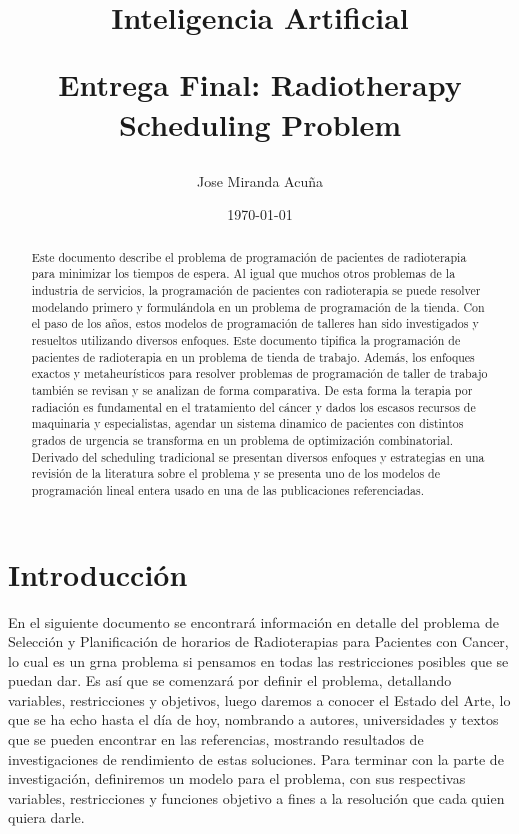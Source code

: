 \documentclass[letter, 10pt]{article}
\begin{document}
\title{Inteligencia Artificial \\ \begin{Large}Entrega Final: Radiotherapy Scheduling Problem\end{Large}}
\author{Jose Miranda Acuña}
\date{\today}
\maketitle





\begin{abstract}

Este documento describe el problema de programación de pacientes de radioterapia para minimizar los tiempos de espera. Al igual que muchos otros problemas de la industria de servicios, la programación de pacientes con radioterapia se puede resolver modelando primero y formulándola en un problema de programación de la tienda. Con el paso de los años, estos modelos de programación de talleres han sido investigados y resueltos utilizando diversos enfoques. Este documento tipifica la programación de pacientes de radioterapia en un problema de tienda de trabajo. Además, los enfoques exactos y metaheurísticos para resolver problemas de programación de taller de trabajo también se revisan y se analizan de forma comparativa. De esta forma la terapia por radiación es fundamental en el tratamiento del cáncer y dados los escasos recursos de maquinaria y especialistas, agendar un sistema dinamico de pacientes con distintos grados de urgencia se transforma en un problema de optimización combinatorial. Derivado del scheduling tradicional se presentan diversos enfoques y estrategias en una revisión de la literatura sobre el problema y se presenta uno de los modelos de programación lineal entera usado en una de las publicaciones referenciadas.

\end{abstract}

\newpage

\section{Introducci\'on}

En el siguiente documento se encontrará información en detalle del problema de Selección y Planificación de horarios de Radioterapias para Pacientes con Cancer, lo cual es un grna problema si pensamos en todas las restricciones posibles que se puedan dar. Es así que se comenzará por definir el problema, detallando variables, restricciones y objetivos, luego daremos a conocer el Estado del Arte, lo que se ha echo hasta el día de hoy, nombrando a autores, universidades y textos que se pueden encontrar en las referencias, mostrando resultados de investigaciones de rendimiento de estas soluciones. Para terminar con la parte de investigación, definiremos un modelo para el problema, con sus respectivas variables, restricciones y funciones objetivo a fines a la resolución que cada quien quiera darle.
\end{document}
